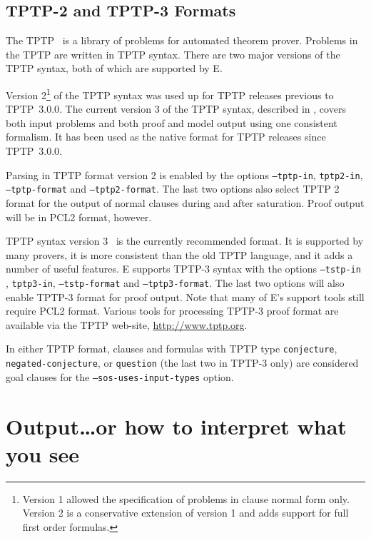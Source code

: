 \documentclass{report}
\begin{document}
\section{TPTP-2 and TPTP-3 Formats}

The TPTP~\cite{Sutcliffe:TPTP-WWW} is a library of
problems for automated theorem prover. Problems in the TPTP are
written in TPTP syntax. There are two major
versions of the TPTP syntax, both of which are supported by E.

Version 2\footnote{Version 1 allowed the specification of problems in
  clause normal form only. Version 2 is a conservative extension of
  version 1 and adds support for full first order formulas.} of the
TPTP syntax was used up for TPTP releases previous to TPTP~3.0.0.  The
current version 3 of the TPTP syntax, described in
\cite{SSCG:IJCAR-2006}, covers both input problems and both proof and
model output using one consistent formalism. It has been used as the
native format for TPTP releases since TPTP~3.0.0.

Parsing in TPTP format version 2 is enabled by the options
\texttt{--tptp-in}, \texttt{tptp2-in}, \texttt{--tptp-format} and
\texttt{--tptp2-format}. The last two options also select TPTP 2
format for the output of normal clauses during and after
saturation. Proof output will be in PCL2 format, however.

TPTP syntax version 3~\cite{SSCG:IJCAR-2006,SSCB:LPAR-2012} is the
currently recommended format. It is supported by many provers, it is
more consistent than the old TPTP language, and it adds a number of
useful features.  E supports TPTP-3 syntax with the options
\texttt{--tstp-in} , \texttt{tptp3-in}, \texttt{--tstp-format} and
\texttt{--tptp3-format}. The last two options will also enable TPTP-3
format for proof output. Note that many of E's support tools still
require PCL2 format. Various tools for processing TPTP-3 proof format
are available via the TPTP web-site, \url{http://www.tptp.org}.

In either TPTP format, clauses and formulas with TPTP type
\texttt{conjecture}, \texttt{negated-conjecture}, or \texttt{question}
(the last two in TPTP-3 only) are considered goal clauses for the
\texttt{--sos-uses-input-types} option.



\chapter{Output\ldots or how to interpret what you see}
\label{sec:output}
\end{document}
